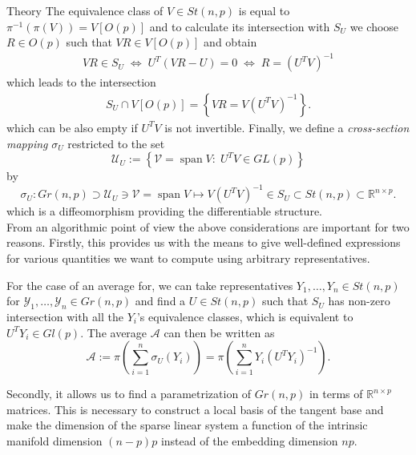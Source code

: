 \begin{chapter}{Theory}
The equivalence class of $V\in St(n,p)$ is equal to $\pi^{-1}(\pi(V))=V[O(p)]$ and to calculate its intersection with $S_U$ we choose $R\in O(p)$ such that
$VR\in V[O(p)]$ and obtain
\begin{align}
    VR\in S_U\;\Leftrightarrow\; U^T(VR-U)=0 \;\Leftrightarrow\; R = (U^TV)^{-1}
\end{align}
which leads to the intersection
\begin{align}
    S_U \cap V[O(p)] = \left\lbrace VR = V(U^{T}V)^{-1} \right\rbrace .
\end{align}
which can be also empty if $U^{T}V$ is not invertible. Finally, we define a \emph{cross-section mapping} $\sigma_U$ restricted to the set
\begin{equation}
    \mathcal{U}_U := \left\lbrace\mathcal{V}=\operatorname{span}V:\; U^TV\in GL(p) \right\rbrace
\end{equation}
by 
\begin{equation}
\label{eq:crosssectionmap}
    \sigma_U: Gr(n,p)\supset \mathcal{U}_U\ni\mathcal{V}=\operatorname{span}V\mapsto V(U^{T}V)^{-1} \in S_U \subset St(n,p)\subset \mathbb{R}^{n\times p}.
\end{equation}
which is a diffeomorphism providing the differentiable structure.\\

From an algorithmic point of view the above considerations are important for two reasons.
Firstly, this provides us with the means to give well-defined expressions for various quantities we want to compute using arbitrary representatives.
\begin{example}[Average]
For the case of an average for, we can take representatives $Y_1,\ldots,Y_n\in St(n,p)$ for $\mathcal{Y}_1,\ldots,\mathcal{Y}_n\in Gr(n,p)$
and find a $U\in St(n,p)$ such that $S_U$ has non-zero intersection with all the $Y_i$'s equivalence classes, which is equivalent
to $U^TY_i\in Gl(p)$. The average $\mathcal{A}$ can then be written as
\begin{equation}
    \mathcal{A} := \pi\left(\sum_{i=1}^{n}\sigma_U(Y_i)\right)=\pi\left(\sum_{i=1}^{n}Y_i(U^{T}Y_i)^{-1}\right).
\end{equation}
\end{example}

Secondly, it allows us to find a parametrization of $Gr(n,p)$ in terms of $\mathbb{R}^{n\times p}$ matrices. This is necessary to construct a local basis of the tangent base
and make the dimension of the sparse linear system a function of the intrinsic manifold dimension $(n-p)p$ instead of the embedding dimension $np$.


\end{chapter}
